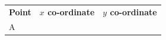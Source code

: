 {\begin{center}
      \label{m39358*id70156}
      
    \noindent
      \tablelasttail{}
      \begin{xtabular*}{\mytablewidth}[t]{|p{10\mystarwidth}|p{10\mystarwidth}|p{10\mystarwidth}|}\hline
    
    
        
                  \textbf{Point}
                 &
    
    
        
                  \textbf{$x$ co-ordinate}
                 &
    
    
        
                  \textbf{$y$ co-ordinate}
     \tabularnewline{}
    
    
        A &
    
    
         &
    
    
     \tabularnewline{}
    

\end{xtabular*}
\end{center}}
